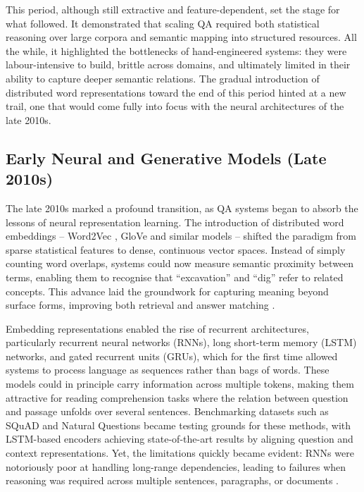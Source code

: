 \begin{spacing}{1.5}
This period, although still extractive and feature-dependent, set the stage for what followed. It demonstrated that scaling QA required both statistical reasoning over large corpora and semantic mapping into structured resources. All the while, it highlighted the bottlenecks of hand-engineered systems: they were labour-intensive to build, brittle across domains, and ultimately limited in their ability to capture deeper semantic relations. The gradual introduction of distributed word representations toward the end of this period hinted at a new trail, one that would come fully into focus with the neural architectures of the late 2010s.

\subsection{Early Neural and Generative Models (Late 2010s)}
The late 2010s marked a profound transition, as QA systems began to absorb the lessons of neural representation learning. The introduction of distributed word embeddings -- Word2Vec \citep{mikolov_efficient_2013}, GloVe \citep{pennington_glove_2014} and similar models -- shifted the paradigm from sparse statistical features to dense, continuous vector spaces. Instead of simply counting word overlaps, systems could now measure semantic proximity between terms, enabling them to recognise that ``excavation'' and ``dig'' refer to related concepts. This advance laid the groundwork for capturing meaning beyond surface forms, improving both retrieval and answer matching \citep{jurafsky_chapter_2024}.

Embedding representations enabled the rise of recurrent architectures, particularly recurrent neural networks (RNNs), long short-term memory (LSTM) networks, and gated recurrent units (GRUs), which for the first time allowed systems to process language as sequences rather than bags of words. These models could in principle carry information across multiple tokens, making them attractive for reading comprehension tasks where the relation between question and passage unfolds over several sentences. Benchmarking datasets such as SQuAD \citep{rajpurkar_squad_2016} and Natural Questions \citep{kwiatkowski_natural_2019} became testing grounds for these methods, with LSTM-based encoders achieving state-of-the-art results by aligning question and context representations. Yet, the limitations quickly became evident: RNNs were notoriously poor at handling long-range dependencies, leading to failures when reasoning was required across multiple sentences, paragraphs, or documents \citep{jurafsky_chapter_2024}.


\end{spacing}
